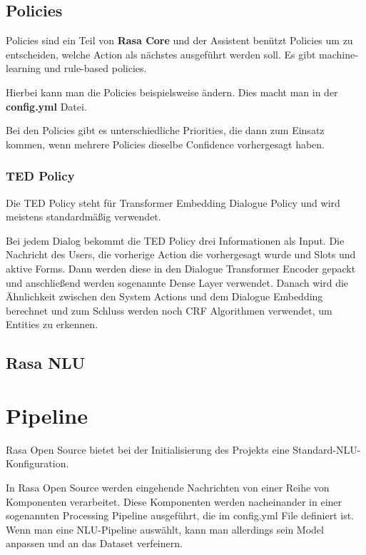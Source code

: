 \subsection{Policies}

Policies sind ein Teil von \textbf{Rasa Core} und der Assistent benützt Policies um zu entscheiden, welche Action als nächstes ausgeführt werden soll.
Es gibt machine-learning und rule-based policies.\cite{policies}

Hierbei kann man die Policies beispielsweise ändern.
Dies macht man in der \textbf{config.yml} Datei.

Bei den Policies gibt es unterschiedliche Priorities, die dann zum Einsatz kommen, wenn mehrere Policies dieselbe Confidence vorhergesagt haben.\cite{policyPriority}

\subsubsection{TED Policy}

Die TED Policy steht für Transformer Embedding Dialogue Policy und wird meistens standardmäßig verwendet.\cite{tedPolicy}

Bei jedem Dialog bekommt die TED Policy drei Informationen als Input.
Die Nachricht des Users, die vorherige Action die vorhergesagt wurde und Slots und aktive Forms.
Dann werden diese in den Dialogue Transformer Encoder gepackt und anschließend werden sogenannte Dense Layer verwendet.
Danach wird die Ähnlichkeit zwischen den System Actions und dem Dialogue Embedding berechnet und zum Schluss werden noch CRF Algorithmen verwendet, um Entities zu erkennen.\cite{tedPolicy}



\subsection{Rasa NLU}

\section{Pipeline}

Rasa Open Source bietet bei der Initialisierung des Projekts eine Standard-NLU-Konfiguration.

In Rasa Open Source werden eingehende Nachrichten von einer Reihe von Komponenten verarbeitet.
Diese Komponenten werden nacheinander in einer sogenannten Processing Pipeline ausgeführt, die im config.yml File definiert ist.
Wenn man eine NLU-Pipeline auswählt, kann man allerdings sein Model anpassen und an das Dataset verfeinern.

